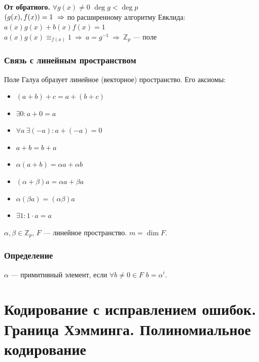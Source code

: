 \documentclass[12pt]{article}
\let\gcd\relax
\DeclareMathOperator{\gcd}{НОД}
\begin{document}
\textbf{От обратного.} $\forall g(x) \neq 0$ $\deg g < \deg p$ \\
$\gcd(g(x), f(x)) = 1\ \Rightarrow$ по расширенному алгоритму Евклида:\\
$a(x)g(x) + b(x)f(x) = 1$ \\
$a(x)g(x) \equiv_{f(x)} 1\ \Rightarrow\ a = g^{-1} \ \Rightarrow\ \mathbb{Z}_p$ — поле

\subsubsection{Связь с линейным пространством}
Поле Галуа образует линейное (векторное) пространство. Его аксиомы:
\begin{itemize}
    \item $(a + b) + c = a + (b + c)$
    \item $\exists 0 : a + 0 = a$
    \item $\forall a \  \exists(-a) : a + (-a) = 0$
    \item $a + b = b + a$
    \item $\alpha(a + b) = \alpha a + \alpha b$
    \item $(\alpha + \beta)a = \alpha a + \beta a$
    \item $\alpha(\beta a) = (\alpha \beta) a$
    \item $\exists 1 : 1 \cdot a = a$
\end{itemize}

$\alpha, \beta \in \mathbb{Z}_p$, $F$ — линейное пространство. $m = \dim F$.

\subsubsection{Определение}
$\alpha$ — примитивный элемент, если $\forall b \neq 0 \in F$ \qquad $b = \alpha^i$.

\section{Кодирование с исправлением ошибок. Граница Хэмминга. Полиномиальное кодирование}
\end{document}

